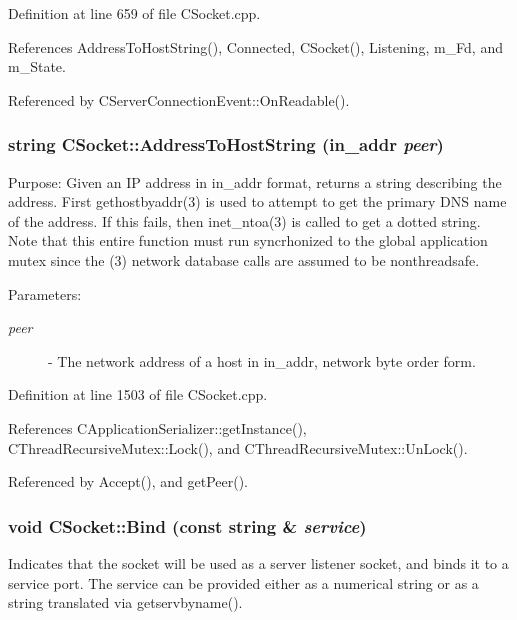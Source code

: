 Definition at line 659 of file CSocket.cpp.

References Address\-To\-Host\-String(), Connected, CSocket(), Listening, m\_\-Fd, and m\_\-State.

Referenced by CServer\-Connection\-Event::On\-Readable().
\subsubsection{\setlength{\rightskip}{0pt plus 5cm}string CSocket::Address\-To\-Host\-String (in\_\-addr {\em peer})\hspace{0.3cm}{\tt  [protected]}}\label{classCSocket_b3}


Purpose: Given an IP address in in\_\-addr format, returns a string describing the address. First gethostbyaddr(3) is used to attempt to get the primary DNS name of the address. If this fails, then inet\_\-ntoa(3) is called to get a dotted string. Note that this entire function must run syncrhonized to the global application mutex since the (3) network database calls are assumed to be nonthreadsafe.\begin{Desc}
\item[Parameters: ]\par
\begin{description}
\item[{\em 
peer}]- The network address of a host in in\_\-addr, network byte order form. \end{description}
\end{Desc}


Definition at line 1503 of file CSocket.cpp.

References CApplication\-Serializer::get\-Instance(), CThread\-Recursive\-Mutex::Lock(), and CThread\-Recursive\-Mutex::Un\-Lock().

Referenced by Accept(), and get\-Peer().
\subsubsection{\setlength{\rightskip}{0pt plus 5cm}void CSocket::Bind (const string \& {\em service})}\label{classCSocket_a7}


Indicates that the socket will be used as a server listener socket, and binds it to a service port. The service can be provided either as a numerical string or as a string translated via getservbyname().

